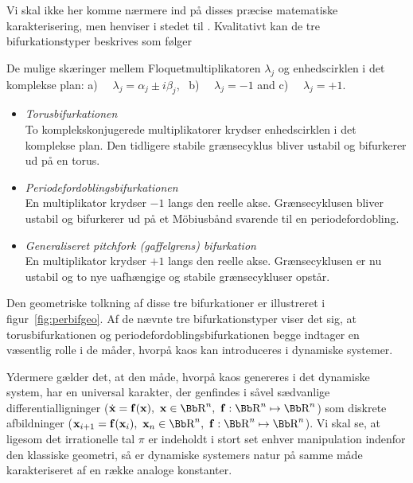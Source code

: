 \vspace{4.0mm}
Vi skal ikke her komme n{\ae}rmere ind p{\aa} disses
pr{\ae}cise matematiske karakteri\-sering, men henviser i
stedet til \cite{Marek}. Kvalitativt kan de tre
bifurkationstyper beskrives som f{\o}lger

{
 
}
{
\caption{\protect\capsize
	 De mulige sk{\ae}ringer mellem Floquetmultiplikatoren 
         $\lambda_j$ og enhedscirklen i det komplekse plan:
	 a) \ \ $\lambda_j = \alpha_j \pm i\beta_j$, \
	 b) \ \ $\lambda_j = -1$ and
	 c) \ \ $\lambda_j = +1$.
}

\label{fig:perbif}
}

\begin{itemize}
 \item {\em Torusbifurkationen}\\
 To komplekskonjugerede multiplikatorer krydser 
 enhedscirklen i det komplekse plan. Den tidligere 
 stabile gr{\ae}nsecyklus bliver ustabil og bifurkerer 
 ud p{\aa} en torus.
 
 \item {\em Periodefordoblingsbifurkationen}\\
 En multiplikator krydser $-1$ langs den reelle akse. 
 Gr{\ae}nsecyklusen bliver ustabil og bifurkerer ud p{\aa} et
 M\"{o}biusb{\aa}nd svarende til en periodefordobling.
 
\item {\em Generaliseret pitchfork (gaffelgrens)
 bifurkation}\\
 En multiplikator krydser $+1$ langs den reelle akse.
 Gr{\ae}nsecyklusen er nu ustabil og to nye uafh{\ae}ngige og
 stabile gr{\ae}nsecykluser opst{\aa}r. 
\end{itemize}

Den geometriske tolkning af disse tre bifurkationer er
illustreret i figur~\ref{fig:perbifgeo}. Af de n{\ae}vnte
tre bifurkationstyper viser det sig, at torusbifurkationen
og periodefor\-doblingsbifurkationen begge indtager en
v{\ae}sentlig rolle i de m{\aa}der, hvorp{\aa} kaos kan
introduceres i dynamiske sy\-stemer.

\vspace{4.0mm}
Ydermere g{\ae}lder det, at den m{\aa}de, hvorp{\aa} kaos
genereres i det dynamiske sy\-stem, har en universal
karakter, der genfindes i s{\aa}vel s{\ae}dvanlige
differentiallig\-ninger ($\dot{\bf x} = {\bf f}({\bf x}),
\mbox{\ }{\bf x}\in\R^n, \mbox{\ }{\bf f}:
\R^n\mapsto\R^n$) som diskrete afbildninger (${\bf x}_{i+1}
= {\bf f}({\bf x}_i),\mbox{\ } {\bf x}_n\in\R^n, \mbox{\
}{\bf f}: \R^n\mapsto\R^n$). Vi skal se, at ligesom det
irrationelle tal $\pi$ er indeholdt i stort set enhver
manipulation indenfor den klassiske geometri, s{\aa} er
dynamiske sy\-stemers natur p{\aa} samme m{\aa}de
karakteriseret af en r{\ae}kke ana\-loge konstanter.

